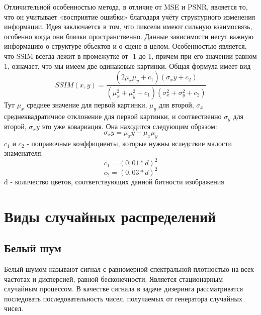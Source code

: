 Отличительной особенностью метода, в отличие от MSE и PSNR, является то, что он учитывает «восприятие ошибки» благодаря учёту структурного изменения информации. Идея заключается в том, что пиксели имеют сильную взаимосвязь, особенно когда они близки пространственно. Данные зависимости несут важную информацию о структуре объектов и о сцене в целом.
 Особенностью является, что SSIM всегда лежит в промежутке от -1 до 1, причем при его значении равном 1, означает, что мы имеем две одинаковые картинки. Общая формула имеет вид
\begin{equation}
SSIM(x,y) = \frac{(2\mu_x\mu_y +c_1)(\sigma_xy+c_2)}{(\mu^2_x+\mu^2_y+c_1)(\sigma^2_x+\sigma^2_y+c_2)}
\label{F:F3}
\end{equation}
Тут $\mu_x$ среднее значение для первой картинки, $\mu_y$  для второй, $\sigma_x$ среднеквадратичное отклонение для первой картинки, и соотвественно $\sigma_y$ для второй, $\sigma_xy$ это уже ковариация. Она находится следующим образом:
\begin{equation}
\sigma_xy = \mu_xy - \mu_x\mu_y
\label{F:F4}
\end{equation} 
  $c_1$ и $c_2$ -  поправочные коэффициенты, которые нужны вследствие малости знаменателя.
\begin{equation}
c_1= (0,01*d)^2 
\label{F:F5} 
\end{equation}
\begin{equation}
c_2=(0,03*d)^2
\label{F:F6}
\end{equation}  
  d - количество цветов, соответствующих данной битности изображения 
\section{Виды случайных распределений} 
\subsection{Белый шум}
Белый шумом называют сигнал с равномерной спектральной плотностью на всех частотах и дисперсией, равной бесконечности. Является стационарным случайным процессом.
В качестве сигнала в задаче дизеринга  рассматриватся последовать последовательность чисел, получаемых от генератора случайных чисел.

